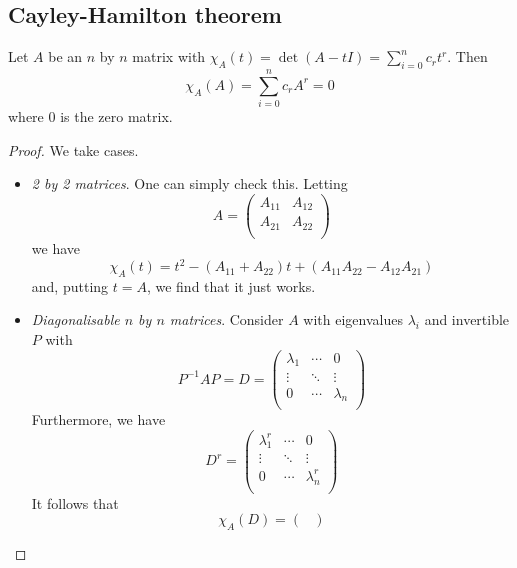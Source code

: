 \documentclass{../../template/note}
\begin{document}
    \subsection{Cayley-Hamilton theorem}

    \begin{theorem}
        Let \(A\) be an \(n\) by \(n\) matrix with \(\chi_A(t) = \det(A - tI) = \sum_{i=0}^n c_rt^r\). Then
        \[
            \chi_A(A) = \sum_{i=0}^n c_r A^r = 0
        \]
        where \(0\) is the zero matrix.
    \end{theorem}
    
    \begin{proof}
        We take cases.
        \begin{itemize}
            \item \emph{2 by 2 matrices}. One can simply check this. Letting
            \[
                A = \begin{pmatrix}
                 A_{11} & A_{12} \\
                 A_{21} & A_{22} \\
                \end{pmatrix}
            \]
            we have
            \[
                \chi_A(t) = t^2 - (A_{11}+A_{22})t + (A_{11}A_{22}-A_{12}A_{21})
            \]
            and, putting \(t=A\), we find that it just works.
            \item \emph{Diagonalisable \(n\) by \(n\) matrices}. Consider \(A\) with eigenvalues \(\lambda_i\) and invertible \(P\) with
            \[
                P^{-1}AP = D = \begin{pmatrix}
                 \lambda_1 & \cdots & 0 \\
                 \vdots & \ddots & \vdots \\
                 0 & \cdots & \lambda_n \\
                \end{pmatrix}
            \]
            Furthermore, we have
            \[
                D^r = \begin{pmatrix}
                 \lambda_1^r & \cdots & 0 \\
                 \vdots & \ddots & \vdots \\
                 0 & \cdots & \lambda_n^r \\
                \end{pmatrix}
            \]
            It follows that
            \[
                \chi_A(D) = \begin{pmatrix}

\end{pmatrix}\]
\end{itemize}
\end{proof}
\end{document}
